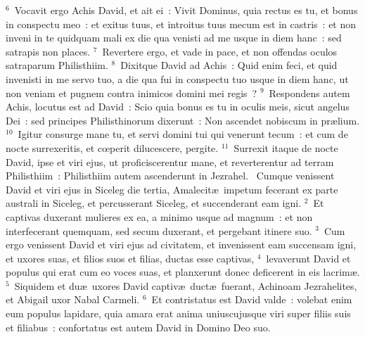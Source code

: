 ${}^{6}$~Vocavit ergo Achis David, et ait ei~: Vivit Dominus, quia rectus es tu, et bonus in conspectu meo~: et exitus tuus, et introitus tuus mecum est in castris~: et non inveni in te quidquam mali ex die qua venisti ad me usque in diem hanc~: sed satrapis non places.
${}^{7}$~Revertere ergo, et vade in pace, et non offendas oculos satraparum Philisthiim.
${}^{8}$~Dixitque David ad Achis~: Quid enim feci, et quid invenisti in me servo tuo, a die qua fui in conspectu tuo usque in diem hanc, ut non veniam et pugnem contra inimicos domini mei regis~?
${}^{9}$~Respondens autem Achis, locutus est ad David~: Scio quia bonus es tu in oculis meis, sicut angelus Dei~: sed principes Philisthinorum dixerunt~: Non ascendet nobiscum in pr\ae lium.
${}^{10}$~Igitur consurge mane tu, et servi domini tui qui venerunt tecum~: et cum de nocte surrexeritis, et cœperit dilucescere, pergite.
${}^{11}$~Surrexit itaque de nocte David, ipse et viri ejus, ut proficiscerentur mane, et reverterentur ad terram Philisthiim~: Philisthiim autem ascenderunt in Jezrahel.
~Cumque venissent David et viri ejus in Siceleg die tertia, Amalecit\ae\ impetum fecerant ex parte australi in Siceleg, et percusserant Siceleg, et succenderant eam igni.
${}^{2}$~Et captivas duxerant mulieres ex ea, a minimo usque ad magnum~: et non interfecerant quemquam, sed secum duxerant, et pergebant itinere suo.
${}^{3}$~Cum ergo venissent David et viri ejus ad civitatem, et invenissent eam succensam igni, et uxores suas, et filios suos et filias, ductas esse captivas,
${}^{4}$~levaverunt David et populus qui erat cum eo voces suas, et planxerunt donec deficerent in eis lacrim\ae .
${}^{5}$~Siquidem et du\ae\ uxores David captiv\ae\ duct\ae\ fuerant, Achinoam Jezrahelites, et Abigail uxor Nabal Carmeli.
${}^{6}$~Et contristatus est David valde~: volebat enim eum populus lapidare, quia amara erat anima uniuscujusque viri super filiis suis et filiabus~: confortatus est autem David in Domino Deo suo.


